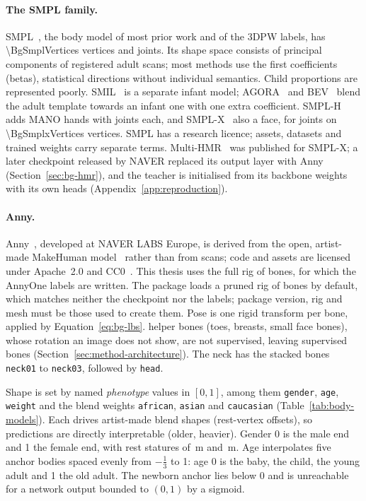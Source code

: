 \paragraph{The SMPL family.}
SMPL~\cite{loper2015smpl}, the body model of most prior work and of the 3DPW labels, has \num{\BgSmplVertices}
vertices and \BgSmplJoints{} joints. Its shape space consists of principal components of registered adult scans; most
methods use the first \BgSmplBetas{} coefficients (betas), statistical directions without individual semantics. Child
proportions are represented poorly. SMIL~\cite{hesse2018smil} is a separate infant model; AGORA~\cite{patel2021agora}
and BEV~\cite{sun2022bev} blend the adult template towards an infant one with one extra coefficient.
SMPL-H~\cite{romero2017mano} adds MANO hands with \BgManoHandJoints{} joints each, and SMPL-X~\cite{pavlakos2019smplx}
also a face, for \BgSmplxJoints{} joints on \num{\BgSmplxVertices} vertices. SMPL has a research licence; assets,
datasets and trained weights carry separate terms. Multi-HMR~\cite{baradel2024multihmr} was published for SMPL-X; a
later checkpoint released by NAVER replaced its output layer with Anny (Section~\ref{sec:bg-hmr}), and the teacher is
initialised from its backbone weights with its own heads (Appendix~\ref{app:reproduction}).

\paragraph{Anny.}
Anny~\cite{bregier2025anny}, developed at NAVER LABS Europe, is derived from the open, artist-made MakeHuman
model~\cite{makehuman} rather than from scans; code and assets are licensed under Apache~2.0 and
CC0~\cite{naver2025annycode}. This thesis uses the full rig of \BgAnnyBones{} bones, for which the AnnyOne labels are
written. The package loads a pruned rig of \BgAnnyDefaultRigBones{} bones by default, which matches neither the
checkpoint nor the labels; package version, rig and mesh must be those used to create them. Pose is one rigid
transform per bone, applied by Equation~\eqref{eq:bg-lbs}. \BgAnnyHelperBones{} helper bones (toes, breasts, small
face bones), whose rotation an image does not show, are not supervised, leaving \BgAnnyActiveBones{} supervised bones (Section~\ref{sec:method-architecture}).
The neck has the stacked bones \texttt{neck01} to \texttt{neck03}, followed by \texttt{head}.

Shape is set by \BgAnnyPhenotypes{} named \emph{phenotype} values in $[0,1]$, among them \texttt{gender},
\texttt{age}, \texttt{weight} and the blend weights \texttt{african}, \texttt{asian} and \texttt{caucasian}
(Table~\ref{tab:body-models}). Each drives artist-made blend shapes (rest-vertex offsets), so predictions are
directly interpretable (older, heavier). Gender 0 is the male end and 1 the female end,
with rest statures of \BgStatureGenderZero\,m and \BgStatureGenderOne\,m. Age interpolates five anchor bodies spaced
evenly from $-\tfrac{1}{3}$ to 1: age 0 is the baby, \BgAgeAnchorChild{} the child, \BgAgeAnchorYoung{} the young adult
and 1 the old adult. The newborn anchor lies below 0 and is unreachable for a network output bounded to $(0,1)$ by a sigmoid.

